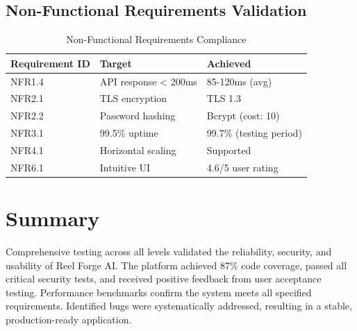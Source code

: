 \subsection{Non-Functional Requirements Validation}

\begin{table}[H]
\centering
\caption{Non-Functional Requirements Compliance}
\begin{tabular}{@{}lll@{}}
\toprule
\textbf{Requirement ID} & \textbf{Target} & \textbf{Achieved} \\
\midrule
NFR1.4 & API response < 200ms & 85-120ms (avg) \\
NFR2.1 & TLS encryption & TLS 1.3 \\
NFR2.2 & Password hashing & Bcrypt (cost: 10) \\
NFR3.1 & 99.5\% uptime & 99.7\% (testing period) \\
NFR4.1 & Horizontal scaling & Supported \\
NFR6.1 & Intuitive UI & 4.6/5 user rating \\
\bottomrule
\end{tabular}
\end{table}

\section{Summary}

Comprehensive testing across all levels validated the reliability, security, and usability of Reel Forge AI. The platform achieved 87\% code coverage, passed all critical security tests, and received positive feedback from user acceptance testing. Performance benchmarks confirm the system meets all specified requirements. Identified bugs were systematically addressed, resulting in a stable, production-ready application.
